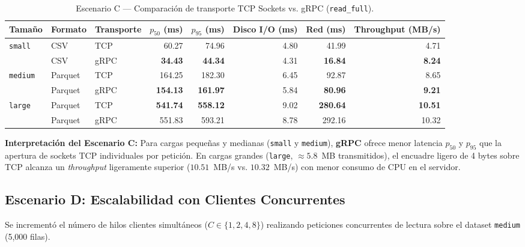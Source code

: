\documentclass[11pt,a4paper]{article}
\begin{document}
\begin{table}[H]
\centering
\caption{Escenario C — Comparación de transporte TCP Sockets vs. gRPC (\texttt{read\_full}).}
\label{tab:scenario_c}
\begin{tabular}{lllrrrrr}
\toprule
\textbf{Tamaño} & \textbf{Formato} & \textbf{Transporte} & \textbf{$p_{50}$ (ms)} & \textbf{$p_{95}$ (ms)} & \textbf{Disco I/O (ms)} & \textbf{Red (ms)} & \textbf{Throughput (MB/s)} \\
\midrule
\multirow{2}{*}{\texttt{small}} & CSV & TCP & 60.27 & 74.96 & 4.80 & 41.99 & 4.71 \\
 & CSV & gRPC & \textbf{34.43} & \textbf{44.34} & 4.31 & \textbf{16.84} & \textbf{8.24} \\
\midrule
\multirow{2}{*}{\texttt{medium}} & Parquet & TCP & 164.25 & 182.30 & 6.45 & 92.87 & 8.65 \\
 & Parquet & gRPC & \textbf{154.13} & \textbf{161.97} & 5.84 & \textbf{80.96} & \textbf{9.21} \\
\midrule
\multirow{2}{*}{\texttt{large}} & Parquet & TCP & \textbf{541.74} & \textbf{558.12} & 9.02 & \textbf{280.64} & \textbf{10.51} \\
 & Parquet & gRPC & 551.83 & 593.21 & 8.78 & 292.16 & 10.32 \\
\bottomrule
\end{tabular}
\end{table}

\textbf{Interpretación del Escenario C:} Para cargas pequeñas y medianas (\texttt{small} y \texttt{medium}), \textbf{gRPC} ofrece menor latencia $p_{50}$ y $p_{95}$ que la apertura de sockets TCP individuales por petición. En cargas grandes (\texttt{large}, $\approx 5.8$~MB transmitidos), el encuadre ligero de 4 bytes sobre TCP alcanza un \textit{throughput} ligeramente superior ($10.51$~MB/s vs. $10.32$~MB/s) con menor consumo de CPU en el servidor.

\subsection{Escenario D: Escalabilidad con Clientes Concurrentes}
Se incrementó el número de hilos clientes simultáneos ($C \in \{1, 2, 4, 8\}$) realizando peticiones concurrentes de lectura sobre el dataset \texttt{medium} (5,000 filas).
\end{document}

